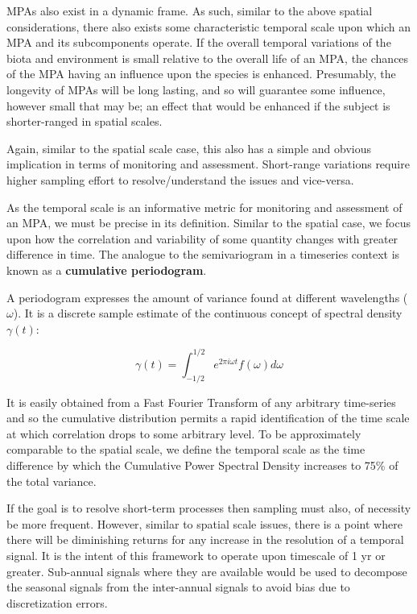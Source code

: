 \documentclass[letterpaper,portrait,11pt]{scrartcl}
\numberwithin{equation}{section}		%
\numberwithin{figure}{section}		%
\numberwithin{table}{section}				%
\begin{document}
MPAs also exist in a dynamic frame. As such, similar to the above spatial considerations, there also exists some characteristic temporal scale upon which an MPA and its subcomponents operate. If the overall temporal variations of the biota and environment is small relative to the overall life of an MPA, the chances of the MPA having an influence upon the species is enhanced. Presumably, the longevity of MPAs will be long lasting, and so will guarantee some influence, however small that may be; an effect that would be enhanced if the subject is shorter-ranged in spatial scales.

Again, similar to the spatial scale case, this also has a simple and obvious implication in terms of monitoring and assessment. Short-range variations require higher sampling effort to resolve/understand the issues and vice-versa.

As the temporal scale is an informative metric for monitoring and assessment of an MPA, we must be precise in its definition. Similar to the spatial case, we focus upon how the correlation and variability of some quantity changes with greater difference in time. The analogue to the semivariogram in a timeseries context is known as a \textbf{cumulative periodogram}. 

A periodogram expresses the amount of variance found at different wavelengths ($\omega$). It is a discrete sample estimate of the continuous concept of spectral density $\gamma(t)$: 

\begin{equation}
  \label{eq:spectraldDensity}
  \gamma(t) = \int_{-1/2}^{1/2} e^{2\pi i \omega t} f(\omega) d \omega
\end{equation}

It is easily obtained from a Fast Fourier Transform of any arbitrary time-series and so the cumulative distribution permits a rapid identification of the time scale at which correlation drops to some arbitrary level. To be approximately comparable to the spatial scale, we define the temporal scale as the time difference by which the Cumulative Power Spectral Density increases to 75\% of the total variance.

If the goal is to resolve short-term processes then sampling must also, of necessity be more frequent. However, similar to spatial scale issues, there is a point where there will be diminishing returns for any increase in the resolution of a temporal signal. It is the intent of this framework to operate upon timescale of 1 yr or greater. Sub-annual signals where they are available would be used to decompose the seasonal signals from the inter-annual signals to avoid bias due to discretization errors. 
\end{document}
